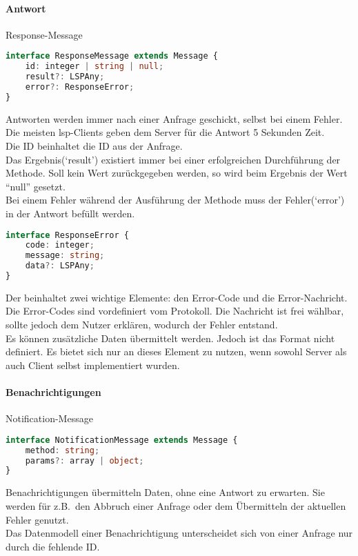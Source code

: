 \documentclass[./einleitung.tex]{subfiles}
\begin{document}
    \paragraph{Antwort}{\footnotesize Response-Message}\\
    \begin{lstlisting}[language=Typescript]
interface ResponseMessage extends Message {
	id: integer | string | null;
	result?: LSPAny;
	error?: ResponseError;
}
    \end{lstlisting}
    Antworten werden immer nach einer Anfrage geschickt, selbst bei einem Fehler.\\
    Die meisten \acrshort{lsp}-Clients geben dem Server für die Antwort 5 Sekunden Zeit.\\
    Die ID beinhaltet die ID aus der Anfrage.\\
    Das Ergebnis(`result') existiert immer bei einer erfolgreichen Durchführung der Methode.
    Soll kein Wert zurückgegeben werden, so wird beim Ergebnis der Wert ``null'' gesetzt.\\
    Bei einem Fehler während der Ausführung der Methode muss der Fehler(`error') in der Antwort befüllt werden.
    \begin{lstlisting}[language=Typescript]
interface ResponseError {
	code: integer;
	message: string;
	data?: LSPAny;
}
    \end{lstlisting}
    Der beinhaltet zwei wichtige Elemente: den Error-Code und die Error-Nachricht.
    Die Error-Codes sind vordefiniert vom Protokoll.\cite{response}
    Die Nachricht ist frei wählbar, sollte jedoch dem Nutzer erklären, wodurch der Fehler entstand.\\
    Es können zusätzliche Daten übermittelt werden.
    Jedoch ist das Format nicht definiert.
    Es bietet sich nur an dieses Element zu nutzen, wenn sowohl Server als auch Client selbst implementiert wurden.

    \paragraph{Benachrichtigungen}{\footnotesize Notification-Message}\\
\begin{lstlisting}[language=Typescript]
interface NotificationMessage extends Message {
	method: string;
	params?: array | object;
}
\end{lstlisting}
    Benachrichtigungen übermitteln Daten, ohne eine Antwort zu erwarten.
    Sie werden für z.B.\ den Abbruch einer Anfrage oder dem Übermitteln der aktuellen Fehler genutzt.\\
    Das Datenmodell einer Benachrichtigung unterscheidet sich von einer Anfrage nur durch die fehlende ID.
\end{document}
